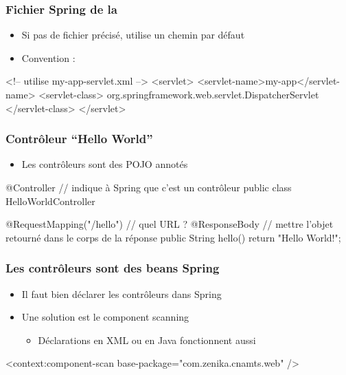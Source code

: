 \begin{frame}[fragile]
 \frametitle{Fichier Spring de la }
 
  \begin{itemize}
   \item Si pas de fichier précisé, utilise un chemin par défaut
   \item Convention : 
  \end{itemize}
  
 \begin{xmlcode}
<!-- utilise my-app-servlet.xml -->
<servlet>
  <servlet-name>my-app</servlet-name>
  <servlet-class>
    org.springframework.web.servlet.DispatcherServlet
  </servlet-class>  
</servlet>
 \end{xmlcode}
 
\end{frame}

\begin{frame}[fragile]
 \frametitle{Contrôleur ``Hello World''}
 
  \begin{itemize}
   \item Les contrôleurs sont des POJO annotés
  \end{itemize}
  
 \begin{javacode}
@Controller // indique \`a Spring que c'est un contr\^oleur
public class HelloWorldController {

  @RequestMapping("/hello") // quel URL ?
  @ResponseBody // mettre l'objet retourn\'e dans le corps de la r\'eponse
  public String hello() {
    return "Hello World!";
  }
  
}
 \end{javacode}
 
\end{frame}

\begin{frame}[fragile]
 \frametitle{Les contrôleurs sont des beans Spring}
 
  \begin{itemize}
   \item Il faut bien déclarer les contrôleurs dans Spring
   \item Une solution est le component scanning
   \begin{itemize}
    \item Déclarations en XML ou en Java fonctionnent aussi
   \end{itemize}
  \end{itemize}
  
 \begin{xmlcode}
<context:component-scan base-package="com.zenika.cnamts.web" />
 \end{xmlcode}
 
\end{frame}


